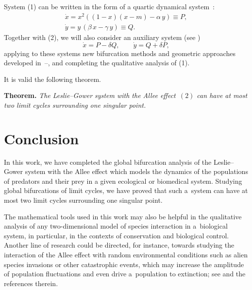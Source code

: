 \documentclass[12pt]{llncs}
\begin{document}
System (1) can be written in the form of a quartic dynamical system~\cite{gaiko5}:
\begin{equation}
    \begin{array}{l}
\dot{x}=x^{2}((1-x)(x-m)-\alpha\,y)\equiv P,
    \\[2mm]
\dot{y}=y\,(\beta\,x-\gamma\,y)\equiv Q.
    \end{array}
\end{equation}
Together with (2), we will also consider an auxiliary system
(see \cite{gaiko1})
    \begin{equation}
\dot{x}=P-\delta Q, \qquad \dot{y}=Q+\delta P,
    \end{equation}
applying to these systems new bifurcation methods and geometric approaches developed
in \cite{gaiko1}\,--\!\cite{gaiko5}, and completing the qualitative analysis of (1).

It is valid the following theorem.
	\par
  \medskip
\noindent \textbf{Theorem.}
\emph{The Leslie--Gower system with the Allee effect~$(2)$ can have at most
two limit cycles surrounding one singular point.}

\section{Conclusion}
In this work, we have completed the global bifurcation analysis of the Leslie--Gower system
with the Allee effect which models the dynamics of the populations of predators and their prey
in a given ecological or biomedical system. Studying global bifurcations of limit cycles, we have
proved that such a~system can have at most two limit cycles surrounding one singular point.
    \par
The mathematical tools used in this work may also be helpful in the qualitative analysis
of any two-dimensional model of species interaction in a~biological system, in particular,
in the contexts of conservation and biological control. Another line of research could be
directed, for instance, towards studying the interaction of the Allee effect with random environmental conditions such as alien species invasions or other catastrophic events,
which may increase the amplitude of population fluctuations and even drive a~population
to extinction; see \cite{gaiko5} and the references therein.
\end{document}

